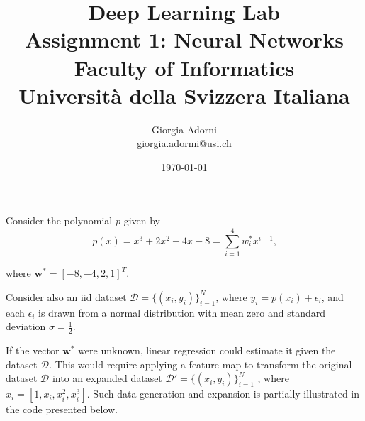\documentclass[12pt]{article}
\title{Deep Learning Lab \\ \Large{Assignment 1: Neural Networks} \\[0.3em] \normalsize{Faculty of Informatics} \\ \normalsize{Università della Svizzera Italiana}}
\author {{Giorgia Adorni}	\\ \normalsize{giorgia.adormi@usi.ch}}
\date{\today}
\begin{document}
 
	
	
	\maketitle 
	
	Consider the polynomial $p$ given by
	\begin{equation*}
	 p(x)=x^3+2x^2-4x-8=\sum_{i=1}^4 w_i^*x^{i-1} \mbox{,}
	\end{equation*} 
	
	where $\textbf{w}^*=[-8,-4,2,1]^T$.
	
	Consider also an iid dataset $\mathcal{D} = \{(x_i, y_i)\}^N_{i=1}$, where $y_i = p(x_i)+\epsilon_i$, and each $\epsilon_i$ is drawn from a normal distribution with mean zero and standard deviation $\sigma = \frac{1}{2}$.
	
	If the vector $\textbf{w}^*$ were unknown, linear regression could estimate it given the dataset $\mathcal{D}$. This would require applying a feature map to transform the
	original dataset $\mathcal{D}$ into an expanded dataset $\mathcal{D}'= \{(x_i, y_i)\}^N_{i=1}$ , where $x_i = [1,x_i,x_i^2,x_i^3]$.
	Such data generation and expansion is partially illustrated in the code presented below.
	
	
\end{document}
